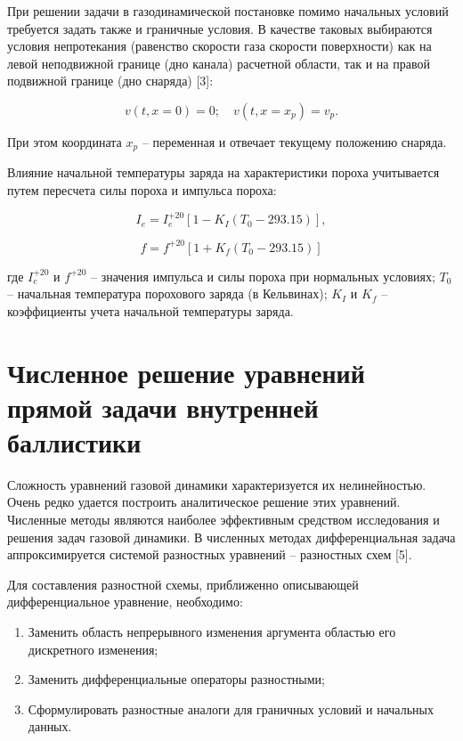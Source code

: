 \documentclass[14pt, a4paper]{report} %
\begin{document}
При решении задачи в газодинамической постановке помимо начальных условий требуется задать также и граничные условия. В качестве таковых выбираются условия непротекания (равенство скорости газа скорости поверхности) как на левой неподвижной границе (дно канала) расчетной области, так и на правой подвижной границе (дно снаряда) [3]:

\[
v(t, x = 0) = 0; \quad v(t, x = x_p) = v_p.
\]

При этом координата \( x_p \) -- переменная и отвечает текущему положению снаряда.

Влияние начальной температуры заряда на характеристики пороха учитывается путем пересчета силы пороха и импульса пороха:

\begin{equation}
I_e = I_e^{+20} \left[ 1 - K_I \left( T_0 - 293.15 \right) \right],
\end{equation}

\begin{equation}
f = f^{+20} \left[ 1 + K_f \left( T_0 - 293.15 \right) \right]
\end{equation}

где \( I_e^{+20} \) и \( f^{+20} \) -- значения импульса и силы пороха при нормальных условиях;  
\( T_0 \) -- начальная температура порохового заряда (в Кельвинах); \( K_I \) и \( K_f \) -- коэффициенты учета начальной температуры заряда.

\section{Численное решение уравнений прямой задачи внутренней баллистики}

Сложность уравнений газовой динамики характеризуется их нелинейностью. Очень редко удается построить аналитическое решение этих уравнений. Численные методы являются наиболее эффективным средством исследования и решения 
задач газовой динамики. В численных методах дифференциальная задача аппроксимируется системой разностных уравнений -- разностных схем [5].

Для составления разностной схемы, приближенно описывающей дифференциальное уравнение, необходимо:

\begin{enumerate}
    \item Заменить область непрерывного изменения аргумента областью его дискретного изменения;
    \item Заменить дифференциальные операторы разностными;
    \item Сформулировать разностные аналоги для граничных условий и начальных данных.
\end{enumerate}
\end{document}
